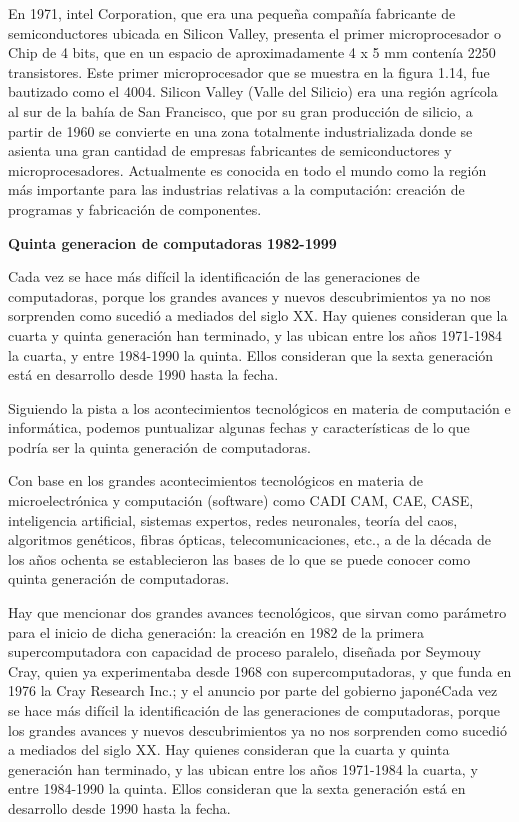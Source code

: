 \documentclass[10pt,a4paper]{article}
\begin{document}
\begin{multicols}{2}
En 1971, intel Corporation, que era una pequeña compañía fabricante de semiconductores ubicada en Silicon Valley, presenta el primer microprocesador o Chip de 4 bits, que en un espacio de aproximadamente 4 x 5 mm contenía 2250 transistores. Este primer microprocesador que se muestra en la figura 1.14, fue bautizado como el 4004.
Silicon Valley (Valle del Silicio) era una región agrícola al sur de la bahía de San Francisco, que por su gran producción de silicio, a partir de 1960 se convierte en una zona totalmente industrializada donde se asienta una gran cantidad de empresas fabricantes de semiconductores y microprocesadores. Actualmente es conocida en todo el mundo como la región más importante para las industrias relativas a la computación: creación de programas y fabricación de componentes.
\begin{center}
\textbf{Quinta generacion de computadoras 1982-1999}
\end{center}
Cada vez se hace más difícil la identificación de las generaciones de computadoras, porque los grandes avances y nuevos descubrimientos ya no nos sorprenden como sucedió a mediados del siglo XX. Hay quienes consideran que la cuarta y quinta generación han terminado, y las ubican entre los años 1971-1984 la cuarta, y entre 1984-1990 la quinta. Ellos consideran que la sexta generación está en desarrollo desde 1990 hasta la fecha.

Siguiendo la pista a los acontecimientos tecnológicos en materia de computación e informática, podemos puntualizar algunas fechas y características de lo que podría ser la quinta generación de computadoras.

Con base en los grandes acontecimientos tecnológicos en materia de microelectrónica y computación (software) como CADI CAM, CAE, CASE, inteligencia artificial, sistemas expertos, redes neuronales, teoría del caos, algoritmos genéticos, fibras ópticas, telecomunicaciones, etc., a de la década de los años ochenta se establecieron las bases de lo que se puede conocer como quinta generación de computadoras.

Hay que mencionar dos grandes avances tecnológicos, que sirvan como parámetro para el inicio de dicha generación: la creación en 1982 de la primera supercomputadora con capacidad de proceso paralelo, diseñada por Seymouy Cray, quien ya experimentaba desde 1968 con supercomputadoras, y que funda en 1976 la Cray Research Inc.; y el anuncio por parte del gobierno japonéCada vez se hace más difícil la identificación de las generaciones de computadoras, porque los grandes avances y nuevos descubrimientos ya no nos sorprenden como sucedió a mediados del siglo XX. Hay quienes consideran que la cuarta y quinta generación han terminado, y las ubican entre los años 1971-1984 la cuarta, y entre 1984-1990 la quinta. Ellos consideran que la sexta generación está en desarrollo desde 1990 hasta la fecha.


\end{multicols}
\end{document}
